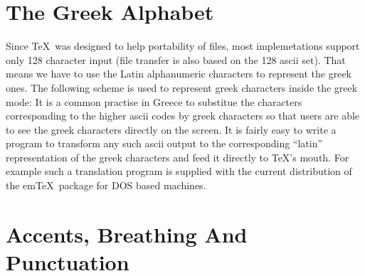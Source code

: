 \section{The Greek Alphabet}

	Since \TeX\ was designed to help portability of files, most
implemetations support only 128 character input (file transfer is
also based on the 128 ascii set). That means we have to use the Latin
alphanumeric characters to represent the greek ones. The following
scheme is used to represent greek characters inside the greek mode:
\math\math
\hbox{}
\math\math
\beginFine
	It is a common practise in Greece to substitue the characters
corresponding to the higher
ascii codes by greek characters so that users are able to see the
greek characters directly on the screen. It is fairly easy to write a
program to transform any such ascii output to the corresponding
``latin'' representation of the greek characters and feed it directly
to \TeX 's mouth. For example such a translation program is supplied
with the current distribution of the em\TeX\ package for DOS based
machines.
\endFine

\section{Accents, Breathing And Punctuation}

